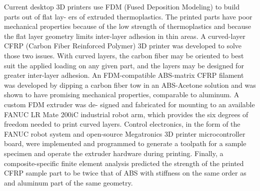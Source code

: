 
Current desktop 3D printers use FDM (Fused Deposition Modeling) to build parts out of flat lay- ers of extruded thermoplastics. The printed parts have poor mechanical properties because of the low strength of thermoplastics and because the flat layer geometry limits inter-layer adhesion in thin areas. A curved-layer CFRP (Carbon Fiber Reinforced Polymer) 3D printer was developed to solve those two issues. With curved layers, the carbon fiber may be oriented to best suit the applied loading on any given part, and the layers may be designed for greater inter-layer adhesion. An FDM-compatible ABS-matrix CFRP filament was developed by dipping a carbon fiber tow in an ABS-Acetone solution and was shown to have promising mechanical properties, comparable to aluminum. A custom FDM extruder was de- signed and fabricated for mounting to an available FANUC LR Mate 200iC industrial robot arm, which provides the six degrees of freedom needed to print curved layers. Control electronics, in the form of the FANUC robot system and open-source Megatronics 3D printer microcontroller board, were implemented and programmed to generate a toolpath for a sample specimen and operate the extruder hardware during printing. Finally, a composite-specific finite element analysis predicted the strength of the printed CFRP sample part to be twice that of ABS with stiffness on the same order as and aluminum part of the same geometry.